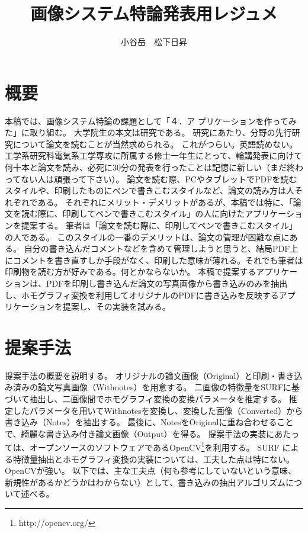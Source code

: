 \documentclass[a4paper, dvipdfmx]{jarticle}
\begin{document}
\title{画像システム特論発表用レジュメ}
\author{小谷岳　松下日昇}

\setlength{\baselineskip}{4.4mm}
\maketitle
\thispagestyle{empty}
\pagestyle{empty}

\section{概要}
本稿では、画像システム特論の課題として「４．ア
プリケーションを作ってみた」に取り組む。
大学院生の本文は研究である。
研究にあたり、分野の先行研究について論文を読むことが当然求められる。
これがつらい。英語読めない。
工学系研究科電気系工学専攻に所属する修士一年生にとって、輪講発表に向けて何十本と論文を読み、必死に30分の発表を行ったことは記憶に新しい（まだ終わってない人は頑張って下さい）。
論文を読む際、PCやタブレットでPDFを読むスタイルや、印刷したものにペンで書きこむスタイルなど、論文の読み方は人それぞれである。
それぞれにメリット・デメリットがあるが、本稿では特に、「論文を読む際に、印刷してペンで書きこむスタイル」の人に向けたアプリケーションを提案する。
筆者は「論文を読む際に、印刷してペンで書きこむスタイル」の人である。
このスタイルの一番のデメリットは、論文の管理が困難な点にある。
自分の書き込んだコメントなどを含めて管理しようと思うと、結局PDF上にコメントを書き直すしか手段がなく、印刷した意味が薄れる。それでも筆者は印刷物を読む方が好みである。何とかならないか。
本稿で提案するアプリケーションは、PDFを印刷し書き込んだ論文の写真画像から書き込みのみを抽出し、ホモグラフィ変換を利用してオリジナルのPDFに書き込みを反映するアプリケーションを提案し、その実装を試みる。

\section{提案手法}
%
提案手法の概要を説明する。
オリジナルの論文画像（Original）と印刷・書き込み済みの論文写真画像（Withnotes）を用意する。
二画像の特徴量をSURFに基づいて抽出し、二画像間でホモグラフィ変換の変換パラメータを推定する\cite{surf}。
推定したパラメータを用いてWithnotesを変換し、変換した画像（Converted）から書き込み（Notes）を抽出する。
最後に、NotesをOriginalに重ね合わせることで、綺麗な書き込み付き論文画像（Output）を得る。
提案手法の実装にあたっては、オープンソースのソフトウェアであるOpenCV\footnote{http://opencv.org/}を利用する。
SURF による特徴量抽出とホモグラフィ変換の実装については、工夫した点は特にない。OpenCVが強い。
以下では、主な工夫点（何も参考にしていないという意味、新規性があるかどうかはわからない）として、書き込みの抽出アルゴリズムについて述べる。
\end{document}
